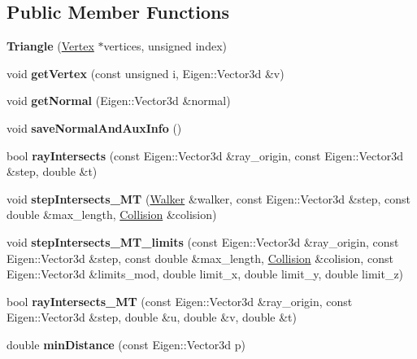 \subsection*{Public Member Functions}
\begin{DoxyCompactItemize}
\item 
\mbox{\label{class_triangle_a420f50ce640dca2aca127ceb68de2e0f}} 
{\bfseries Triangle} (\hyperlink{class_vertex}{Vertex} $\ast$vertices, unsigned index)
\item 
\mbox{\label{class_triangle_a31d9c90daae516c82e03dcbb492a1fe5}} 
void {\bfseries get\+Vertex} (const unsigned i, Eigen\+::\+Vector3d \&v)
\item 
\mbox{\label{class_triangle_ac134db353d4bd34eae298e6220bd0254}} 
void {\bfseries get\+Normal} (Eigen\+::\+Vector3d \&normal)
\item 
\mbox{\label{class_triangle_acb81455a547203d7b61b6d178578620a}} 
void {\bfseries save\+Normal\+And\+Aux\+Info} ()
\item 
\mbox{\label{class_triangle_a087e0b0bfb2c49ed4854d8b0e939e7d2}} 
bool {\bfseries ray\+Intersects} (const Eigen\+::\+Vector3d \&ray\+\_\+origin, const Eigen\+::\+Vector3d \&step, double \&t)
\item 
\mbox{\label{class_triangle_ac1197111887bcba4098f20a71108105c}} 
void {\bfseries step\+Intersects\+\_\+\+MT} (\hyperlink{class_walker}{Walker} \&walker, const Eigen\+::\+Vector3d \&step, const double \&max\+\_\+length, \hyperlink{class_collision}{Collision} \&colision)
\item 
\mbox{\label{class_triangle_a01e5c101c7455d7030080594628533bf}} 
void {\bfseries step\+Intersects\+\_\+\+M\+T\+\_\+limits} (const Eigen\+::\+Vector3d \&ray\+\_\+origin, const Eigen\+::\+Vector3d \&step, const double \&max\+\_\+length, \hyperlink{class_collision}{Collision} \&colision, const Eigen\+::\+Vector3d \&limits\+\_\+mod, double limit\+\_\+x, double limit\+\_\+y, double limit\+\_\+z)
\item 
\mbox{\label{class_triangle_a733c94320a1effcee36b7382e92be1e6}} 
bool {\bfseries ray\+Intersects\+\_\+\+MT} (const Eigen\+::\+Vector3d \&ray\+\_\+origin, const Eigen\+::\+Vector3d \&step, double \&u, double \&v, double \&t)
\item 
\mbox{\label{class_triangle_afd80e0b45910181568098c04e5a2046d}} 
double {\bfseries min\+Distance} (const Eigen\+::\+Vector3d p)
\end{DoxyCompactItemize}

